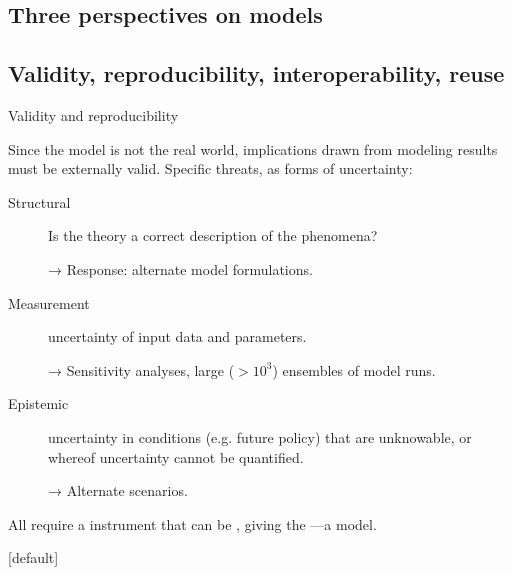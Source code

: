 \documentclass[12pt,aspectratio=169]{beamer}
\begin{document}



\subsection{Three perspectives on models}


\subsection{Validity, reproducibility, interoperability, reuse}
\begin{frame}{Validity and reproducibility}

Since the model is not the real world, implications drawn from modeling results must be externally valid.
Specific threats, as forms of uncertainty:

\begin{description}
  \item [Structural] Is the theory a correct description of the phenomena?

    → Response: alternate model formulations.

  \item [Measurement] uncertainty of input data and parameters.

    → Sensitivity analyses, large ($>10^3$) ensembles of model runs.

  \item [Epistemic] uncertainty in conditions (e.g. future policy) that are unknowable, or whereof uncertainty cannot be quantified.

    → Alternate scenarios.
\end{description}

All require a  instrument that can be , giving the —a  model.
\end{frame}

{
  [default]
  
}
\end{document}
